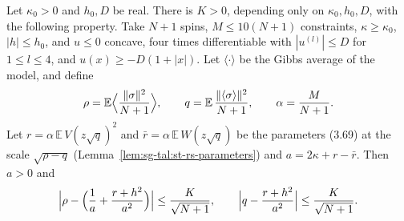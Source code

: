 \begin{theorem}\label{thm:sg-tal:st-rs-accuracy}
  \leanok
Let $\kappa_0>0$ and $h_0,D$ be real. There is $K>0$, depending only on $\kappa_0,h_0,D$, with the following
property. Take $N+1$ spins, $M\le10(N+1)$ constraints, $\kappa\ge\kappa_0$, $|h|\le h_0$, and $u\le0$
concave, four times differentiable with $|u^{(l)}|\le D$ for $1\le l\le4$, and $u(x)\ge-D(1+|x|)$. Let
$\langle\cdot\rangle$ be the Gibbs average of the model, and define
\[
\rho=\mathbb E\Bigl\langle\frac{\|\sigma\|^2}{N+1}\Bigr\rangle,\qquad
q=\mathbb E\,\frac{\|\langle\sigma\rangle\|^2}{N+1},\qquad\alpha=\frac M{N+1} .
\]
Let $r=\alpha\,\mathbb E\,V(z\sqrt q)^2$ and $\bar r=\alpha\,\mathbb E\,W(z\sqrt q)$ be the parameters (3.69) at
the scale $\sqrt{\rho-q}$ (Lemma~\ref{lem:sg-tal:st-rs-parameters}) and $a=2\kappa+r-\bar r$. Then $a>0$ and
\[
\Bigl|\rho-\Bigl(\frac1a+\frac{r+h^2}{a^2}\Bigr)\Bigr|\le\frac K{\sqrt{N+1}},\qquad
\Bigl|q-\frac{r+h^2}{a^2}\Bigr|\le\frac K{\sqrt{N+1}} .
\]
\end{theorem}
